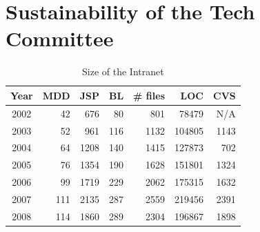 \documentclass{acm_proc_article-sp}
\begin{document}
\section{Sustainability of the Tech Committee}\label{sec:techCommittee}
\begin{table}
	\centering
	\label{tab:intranet-size}
	\caption{Size of the Intranet}
	\begin{tabular}{c|r|r|r|r|r|r}
		\hline
		\hline
		Year	& MDD	& JSP	& BL	& \# files	& LOC		& CVS	 \\
		\hline
		\hline
		2002 	& 42	& 676	& 80	& 801		& 78479 	& N/A	 \\ 
		\hline
		2003 	& 52	& 961	& 116	& 1132		& 104805 	& 1143	 \\ 
		\hline
		2004 	& 64	& 1208	& 140	& 1415		& 127873 	& 702	 \\ 
		\hline
		2005 	& 76	& 1354	& 190	& 1628		& 151801 	& 1324	 \\ 
		\hline
		2006 	& 99	& 1719	& 229	& 2062		& 175315 	& 1632	 \\ 
		\hline
		2007 	& 111	& 2135	& 287	& 2559		& 219456 	& 2391	 \\ 
		\hline
		2008 	& 114	& 1860	& 289	& 2304		& 196867 	& 1898	 \\ 
		\hline
		
		\hline
		\hline
	\end{tabular}
\end{table} 
\end{document}
